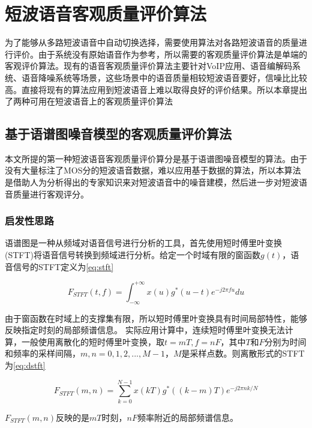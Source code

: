 \chapter{短波语音客观质量评价算法}
\label{chapter:algorithms}

为了能够从多路短波语音中自动切换选择，需要使用算法对各路短波语音的质量进行评价。由于系统没有原始语音作为参考，所以需要的客观质量评价算法是单端的客观评价算法。现有的语音客观质量评价算法主要针对VoIP应用、语音编解码系统、语音降噪系统等场景，这些场景中的语音质量相较短波语音要好，信噪比比较高。直接将现有的算法应用到短波语音上难以取得良好的评价结果。所以本章提出了两种可用在短波语音上的客观质量评价算法

\section{基于语谱图噪音模型的客观质量评价算法} \label{section:alg1}

本文所提的第一种短波语音客观质量评价算分是基于语谱图噪音模型的算法。由于没有大量标注了MOS分的短波语音数据，难以应用基于数据的算法，所以本算法是借助人为分析得出的专家知识来对短波语音中的噪音建模，然后进一步对短波语音质量进行客观评分。

\subsection{启发性思路} \label{section:alg1-1}

语谱图是一种从频域对语音信号进行分析的工具，首先使用短时傅里叶变换(STFT)将语音信号转换到频域进行分析。给定一个时域有限的窗函数$g(t)$，语音信号的STFT定义为\ref{eq:stft}

\begin{equation}\label{eq:stft}
F_{STFT}(t, f) = \int_{-\infty}^{+\infty}x(u)g^*(u-t)e^{-j2\pi fu}du
\end{equation}

由于窗函数在时域上的支撑集有限，所以短时傅里叶变换具有时间局部特性，能够反映指定时刻的局部频谱信息。
实际应用计算中，连续短时傅里叶变换无法计算，一般使用离散化的短时傅里叶变换，取$t=mT, f=nF$，其中$T$和$F$分别为时间和频率的采样间隔，$m,n=0,1,2,...,M-1$，$M$是采样点数。则离散形式的STFT为\ref{eq:dstft}

\begin{equation}\label{eq:dstft}
F_{STFT}(m, n) = \sum_{k=0}^{N-1}x(kT)g^*((k-m)T)e^{-j2\pi nk/N}
\end{equation}

$F_{STFT}(m, n)$反映的是$mT$时刻，$nF$频率附近的局部频谱信息。

